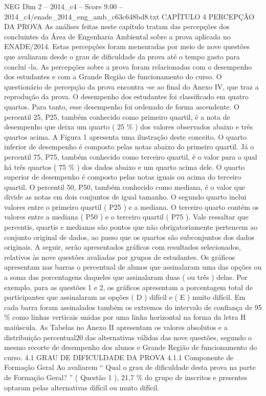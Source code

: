 \begin{textsample}{NEG Dim 2 – 2014\_c4 – Score 9.00 – 2014\_c4/enade\_2014\_eng\_amb\_c63c648bd8.txt}  \label{ex:f2_neg_320}
CAPÍTULO 4 PERCEPÇÃO DA PROVA As análises feitas neste capítulo tratam das percepções dos concluintes da Área de Engenharia Ambiental sobre a prova aplicada no ENADE/2014.
Estas percepções foram mensuradas por meio de nove questões que avaliaram desde o grau de dificuldade da prova até o tempo gasto para concluí -la.
As percepções sobre a prova foram relacionadas com o desempenho dos estudantes e com a Grande Região de funcionamento do curso.
O questionário de percepção da prova encontra -se ao final do Anexo IV, que traz a reprodução da prova.
O desempenho dos estudantes foi classificado em quatro quartos.
Para tanto, esse desempenho foi ordenado de forma ascendente.
O percentil 25, P25, também conhecido como primeiro quartil, é a nota de desempenho que deixa um quarto ( 25 \% ) dos valores observados abaixo e três quartos acima.
A Figura 1 apresenta uma ilustração deste conceito.
O quarto inferior de desempenho é composto pelas notas abaixo do primeiro quartil.
Já o percentil 75, P75, também conhecido como terceiro quartil, é o valor para o qual há três quartos ( 75 \% ) dos dados abaixo e um quarto acima dele.
O quarto superior de desempenho é composto pelas notas iguais ou acima do terceiro quartil.
O percentil 50, P50, também conhecido como mediana, é o valor que divide as notas em dois conjuntos de igual tamanho.
O segundo quarto inclui valores entre o primeiro quartil ( P25 ) e a mediana.
O terceiro quarto contém os valores entre a mediana ( P50 ) e o terceiro quartil ( P75 ).
Vale ressaltar que percentis, quartis e medianas são pontos que não obrigatoriamente pertencem ao conjunto original de dados, ao passo que os quartos são subconjuntos dos dados originais.
A seguir, serão apresentados gráficos com resultados selecionados, relativos às nove questões avaliadas por grupos de estudantes.
Os gráficos apresentam nas barras o percentual de alunos que assinalaram uma das opções ou a soma das porcentagens daqueles que assinalaram duas ( ou três ) delas.
Por exemplo, para as questões 1 e 2, os gráficos apresentam a porcentagem total de participantes que assinalaram as opções ( D ) difícil e ( E ) muito difícil.
Em cada barra foram assinalados também os extremos do intervalo de confiança de 95 \% como linhas verticais unidas por uma linha horizontal na forma da letra H maiúscula.
As Tabelas no Anexo II apresentam os valores absolutos e a distribuição percentual20 das alternativas válidas das nove questões, segundo o mesmo recorte de desempenho dos alunos e Grande Região de funcionamento do curso. 4.1 GRAU DE DIFICULDADE DA PROVA 4.1.1 Componente de Formação Geral Ao avaliarem “ Qual o grau de dificuldade desta prova na parte de Formação Geral? ” ( Questão 1 ), 21,7 \% do grupo de inscritos e presentes optaram pelas alternativas difícil ou muito difícil.

\end{textsample}
